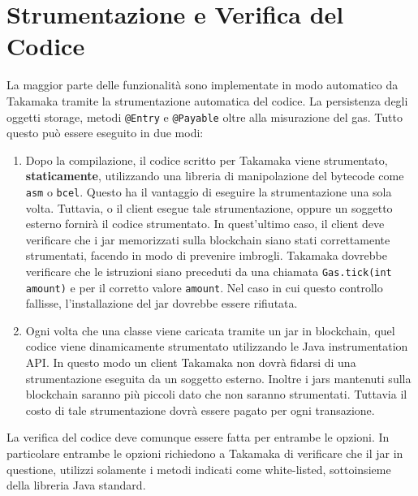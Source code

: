 \section{Strumentazione e Verifica del Codice} \label{takamaka:strumentazione-e-verifica-del-codice}
La maggior parte delle funzionalità sono implementate in modo automatico da Takamaka tramite la strumentazione automatica del codice. La persistenza degli oggetti storage, metodi \lstinline|@Entry| e \lstinline|@Payable| oltre alla misurazione del gas. Tutto questo può essere eseguito in due modi:
\begin{enumerate}
	\item Dopo la compilazione, il codice scritto per Takamaka viene strumentato, \textbf{staticamente}, utilizzando una libreria di manipolazione del bytecode come \lstinline|asm| o \lstinline|bcel|. Questo ha il vantaggio di eseguire la strumentazione una sola volta. Tuttavia, o il client esegue tale strumentazione, oppure un soggetto esterno fornirà il codice strumentato. In quest'ultimo caso, il client deve verificare che i jar memorizzati sulla blockchain siano stati correttamente strumentati, facendo in modo di prevenire imbrogli. Takamaka dovrebbe verificare che le istruzioni siano preceduti da una chiamata \lstinline|Gas.tick(int amount)| e per il corretto valore \lstinline|amount|. Nel caso in cui questo controllo fallisse, l'installazione del jar dovrebbe essere rifiutata.
	\item Ogni volta che una classe viene caricata tramite un jar in blockchain, quel codice viene dinamicamente strumentato utilizzando le Java instrumentation API. In questo modo un client Takamaka non dovrà fidarsi di una strumentazione eseguita da un soggetto esterno. Inoltre i jars mantenuti sulla blockchain saranno più piccoli dato che non saranno strumentati. Tuttavia il costo di tale strumentazione dovrà essere pagato per ogni transazione.
\end{enumerate}
%
La verifica del codice deve comunque essere fatta per entrambe le opzioni. In particolare entrambe le opzioni richiedono a Takamaka di verificare che il jar in questione, utilizzi solamente i metodi indicati come white-listed, sottoinsieme della libreria Java standard.

